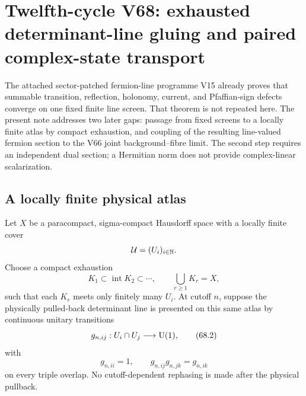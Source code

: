 \documentclass[11pt]{article}
\theoremstyle{remark}
\begin{document}

\section{Twelfth-cycle V68: exhausted determinant-line gluing and
paired complex-state transport}
\label{sec:v12v68}

The attached sector-patched fermion-line programme V15 already proves
that summable transition, reflection, holonomy, current, and
Pfaffian-sign defects converge on one fixed finite line screen.
That theorem is not repeated here.  The present note addresses two
later gaps: passage from fixed screens to a locally finite atlas by
compact exhaustion, and coupling of the resulting line-valued
fermion section to the V66 joint background--fibre limit.  The
second step requires an independent dual section; a Hermitian norm
does not provide complex-linear scalarization.

\subsection{A locally finite physical atlas}

Let \(X\) be a paracompact, sigma-compact Hausdorff space with a
locally finite cover
\[
                         {\cal U}=(U_i)_{i\in\mathbb N}.
\]
Choose a compact exhaustion
\[
 K_1\subset\operatorname{int}K_2\subset\cdots,
 \qquad
 \bigcup_{r\geq1}K_r=X,                            \tag{68.1}
\]
such that each \(K_r\) meets only finitely many \(U_i\).  At cutoff
\(n\), suppose the physically pulled-back determinant line is
presented on this same atlas by continuous unitary transitions
\begin{equation}
 g_{n,ij}:U_i\cap U_j\longrightarrow{\rm U}(1),   \tag{68.2}
\end{equation}
with
\begin{equation}
 g_{n,ii}=1,\qquad
 g_{n,ij}g_{n,jk}=g_{n,ik}                        \tag{68.3}
\end{equation}
on every triple overlap.  No cutoff-dependent rephasing is made
after the physical pullback.
\end{document}
